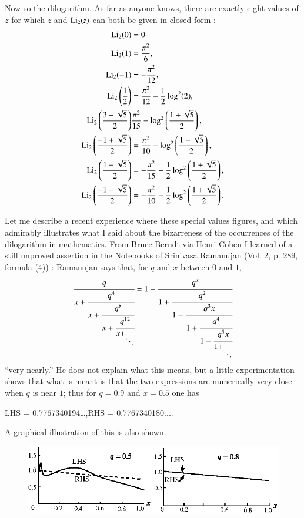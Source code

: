 Now so the dilogarithm. As far as anyone knows, there are exactly eight values of $z$ for which $z$ and $\operatorname{Li}_{2}(z)$ can both be given in closed form :
\begin{align*}
\operatorname{Li}_{2}(0) &=0\\
\operatorname{Li}_{2}(1) &= \dfrac{\pi^{2}}{6},\\
\operatorname{Li}_{2}(-1) &= -\dfrac{\pi^{2}}{12},\\
\operatorname{Li}_{2}\left(\dfrac{1}{2}\right) &= \frac{\pi^{2}}{12}-\dfrac{1}{2}\log^{2}(2),\\
\operatorname{Li}_{2}\left(\dfrac{3-\sqrt{5}}{2}\right) &\dfrac{\pi^{2}}{15}-\log^{2}\left(\dfrac{1+\sqrt{5}}{2}\right),\\
\operatorname{Li}_{2}\left(\dfrac{-1+\sqrt{5}}{2}\right) &=\dfrac{\pi^{2}}{10}-\log^{2}\left(\dfrac{1+\sqrt{5}}{2}\right),\\
\operatorname{Li}_{2}\left(\dfrac{1-\sqrt{5}}{2}\right) &=-\dfrac{\pi^{2}}{15}+\dfrac{1}{2}\log^{2}\left(\dfrac{1+\sqrt{5}}{2}\right),\\
\operatorname{Li}_{2}\left(\dfrac{-1-\sqrt{5}}{2}\right) &=-\dfrac{\pi^{2}}{10}+\dfrac{1}{2}\log^{2}\left(\dfrac{1+\sqrt{5}}{2}\right).
\end{align*}\pageoriginale

Let me describe a recent experience where these special values figures, and which admirably illustrates what I said about the bizarreness of the occurrences of the dilogarithm in mathematics. From Bruce Berndt via Henri Cohen I learned of a still unproved assertion in the Notebooks of Srinivasa Ramanujan (Vol. 2, p. 289, formula (4)) : Ramanujan says that, for $q$ and $x$ between $0$ and $1$,
$$
\cfrac{q}{x+\cfrac{q^{4}}{x+\cfrac{q^{8}}{x+\cfrac{q^{12}}{x+_{\displaystyle\ddots}}}}} = 1- \cfrac{q^{x}}{1+\cfrac{q^{2}}{1-\cfrac{q^{3}x}{1+\cfrac{q^{4}}{1-\cfrac{q^{5}x}{1+_{\displaystyle\ddots}}}}}}
$$
``very nearly.'' He does not explain what this means, but a little experimentation shows that what is meant is that the two expressions are numerically very close when $q$ is near $1$; thus for $q=0.9$ and $x=0.5$ one has
\begin{center}
LHS = 0.7767340194\ldots,\qquad RHS = 0.7767340180....
\end{center}\pageoriginale

A graphical illustration of this is also shown.
\begin{figure}[H]
\centering
\includegraphics[scale=1.1]{figures/fig2.eps}
\end{figure}

